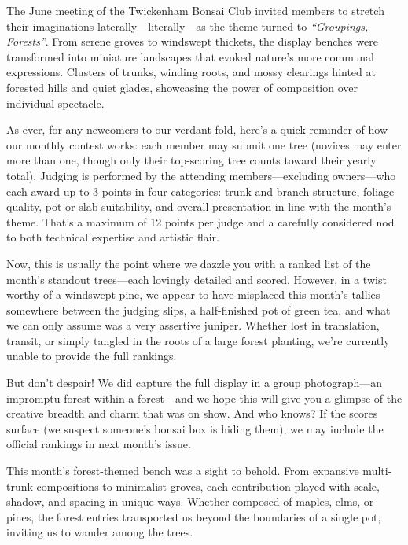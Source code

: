 \label{2025-06-contest}
\noindent
The June meeting of the Twickenham Bonsai Club invited members to stretch their imaginations laterally---literally---as the theme turned to \textit{``Groupings, Forests''}.
From serene groves to windswept thickets, the display benches were transformed into miniature landscapes that evoked nature's more communal expressions.
Clusters of trunks, winding roots, and mossy clearings hinted at forested hills and quiet glades, showcasing the power of composition over individual spectacle.

As ever, for any newcomers to our verdant fold, here's a quick reminder of how our monthly contest works: each member may submit one tree (novices may enter more than one, though only their top\--scoring tree counts toward their yearly total).
Judging is performed by the attending members---excluding owners---who each award up to 3 points in four categories: trunk and branch structure, foliage quality, pot or slab suitability, and overall presentation in line with the month's theme.
That's a maximum of 12 points per judge and a carefully considered nod to both technical expertise and artistic flair.

Now, this is usually the point where we dazzle you with a ranked list of the month's standout trees---each lovingly detailed and scored.
However, in a twist worthy of a windswept pine, we appear to have misplaced this month's tallies somewhere between the judging slips, a half\--finished pot of green tea, and what we can only assume was a very assertive juniper.
Whether lost in translation, transit, or simply tangled in the roots of a large forest planting, we're currently unable to provide the full rankings.

But don't despair!
We did capture the full display in a group photograph---an impromptu forest within a forest---and we hope this will give you a glimpse of the creative breadth and charm that was on show.
And who knows?
If the scores surface (we suspect someone's bonsai box is hiding them), we may include the official rankings in next month's issue.

\noindent
This month's forest\--themed bench was a sight to behold.
From expansive multi\--trunk compositions to minimalist groves, each contribution played with scale, shadow, and spacing in unique ways.
Whether composed of maples, elms, or pines, the forest entries transported us beyond the boundaries of a single pot, inviting us to wander among the trees.

